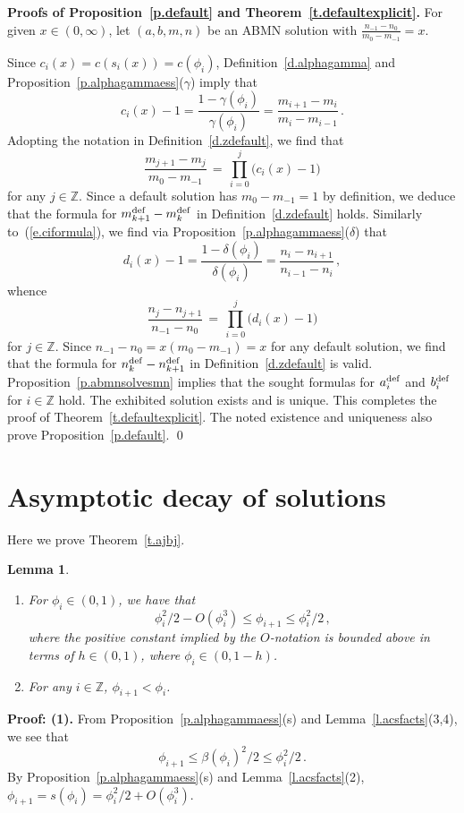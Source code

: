 \documentclass[letterpaper,11pt,oneside,reqno]{amsbook}
\newcommand{\Z}{\ensuremath{\mathbb{Z}}}
\numberwithin{figure}{chapter}
\newtheorem{lemma}[theorem]{Lemma}
\theoremstyle{definition}
\theoremstyle{definition}
\theoremstyle{definition}
\theoremstyle{definition}
\theoremstyle{definition}
\newcommand{\macbeta}{\beta}
\newcommand{\macphi}{\phi}
\newcommand{\const}{h}
\newcommand{\adef}{a^{\rm def}}
\newcommand{\bdef}{b^{\rm def}}
\newcommand{\mdef}{m^{\rm def}}
\newcommand{\ndef}{n^{\rm def}}
\newcommand{\abmnmacspace}{\textrm{ABMN} }
\begin{document}
{\bf Proofs of Proposition~\ref{p.default} and Theorem~\ref{t.defaultexplicit}.}
For given $x \in (0,\infty)$, let $(a,b,m,n)$ be an \abmnmacspace solution with $\tfrac{n_{-1} - n_0}{m_0 - m_{-1}}  =x$.
 
Since $c_i(x) = c(s_i(x)) = c(\phi_i)$, Definition~\ref{d.alphagamma} and Proposition~\ref{p.alphagammaess}($\gamma$) imply that
\begin{equation}\label{e.ciformula}
  c_i(x) - 1 = \frac{1 - \gamma(\phi_i)}{\gamma(\phi_i)} = \frac{m_{i+1} - m_i}{m_i - m_{i-1}} \, .
\end{equation}
Adopting the notation in Definition~\ref{d.zdefault}, we find that 
\begin{equation}\label{e.mdifferenceratio}
\frac{m_{j+1} - m_j}{m_0 - m_{-1}} \, = \, \prod_{i=0}^j \big( c_i(x) - 1 \big)
\end{equation}
for any $j \in \Z$. Since a default solution has $m_0 - m_{-1} = 1$ by definition, we deduce that the formula for $\mdef_{k+1} - \mdef_k$ in Definition~\ref{d.zdefault} holds. Similarly to~(\ref{e.ciformula}), we find via  Proposition~\ref{p.alphagammaess}($\delta$) that
$$
  d_i(x) - 1 = \frac{1 - \delta(\phi_i)}{\delta(\phi_i)} = \frac{n_i - n_{i+1}}{n_{i-1} - n_i} \, ,
$$
whence 
$$
\frac{n_j - n_{j+1}}{n_{-1} - n_0} \, = \, \prod_{i=0}^j \big( d_i(x) - 1 \big)
$$
for $j \in \Z$. Since $n_{-1} - n_0 = x(m_0 - m_{-1}) = x$ for any default solution, we find that the formula for $\ndef_k - \ndef_{k+1}$ in Definition~\ref{d.zdefault} is valid. 
Proposition~\ref{p.abmnsolvesmn} implies that the sought formulas for $\adef_i$ and $\bdef_i$ for $i \in \Z$ hold.
The exhibited solution exists and is unique. This completes the proof of Theorem~\ref{t.defaultexplicit}. 
The noted existence and uniqueness also prove Proposition~\ref{p.default}. 
\qed


  \section{Asymptotic decay of solutions}
  Here we prove Theorem~\ref{t.ajbj}.

\begin{lemma}\label{l.deltadecay}
\leavevmode
\begin{enumerate}
\item
 For $\macphi_i \in (0,1)$, we have that
$$
 \macphi_i^2/2 - O (\macphi_i^3) \leq \macphi_{i+1} \leq \macphi_i^2/2 \, ,
$$
where the positive constant implied by the $O$-notation is bounded above in terms of $\const \in (0,1)$, where $\macphi_i \in (0,1-\const)$. 
\item For any $i \in \Z$, $\macphi_{i+1} < \macphi_i$.
\end{enumerate}
\end{lemma}
{\bf Proof: (1).} From Proposition~\ref{p.alphagammaess}(s) 
and Lemma~\ref{l.acsfacts}(3,4), we see  that 
$$
\macphi_{i+1} \leq \macbeta(\macphi_i)^2/2 \leq \macphi_i^2/2 \, .
$$
By Proposition~\ref{p.alphagammaess}(s) and Lemma~\ref{l.acsfacts}(2), 
$\macphi_{i+1} = s(\macphi_i) = \macphi_i^2/2 + O(\macphi_i^3)$. 
\end{document}
